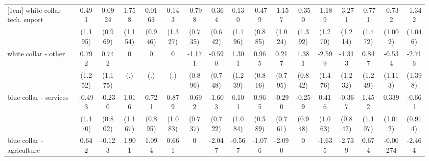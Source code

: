 {\begin{tabular}{l*{16}{c}}
[1em]
white collar - tech. suport&       0.491         &      0.0924         &       1.758         &      0.0163         &       0.143         &      -0.798         &      -0.364         &       0.130         &      -0.479         &      -1.157         &      -0.350         &      -1.189         &      -3.271\sym{**} &      -0.771         &      -0.732         &      -1.342         \\
                    &     (1.195)         &     (0.969)         &     (1.154)         &     (0.946)         &     (1.327)         &     (0.735)         &     (0.642)         &     (1.196)         &     (0.885)         &     (1.024)         &     (1.392)         &     (1.270)         &     (1.214)         &     (1.472)         &     (1.002)         &     (1.046)         \\
[1em]
white collar - other&       0.792         &       0.742         &           0         &           0         &           0         &      -1.171         &      -0.590         &       1.301         &       0.965         &       0.217         &       1.381         &      -2.599         &      -1.313         &       0.847         &      -0.534         &      -2.716         \\
                    &     (1.252)         &     (1.175)         &         (.)         &         (.)         &         (.)         &     (0.896)         &     (0.748)         &     (1.239)         &     (0.816)         &     (0.795)         &     (0.842)         &     (1.476)         &     (1.232)         &     (1.249)         &     (1.113)         &     (1.398)         \\
[1em]
blue collar - services&      -0.493         &      -0.230         &       1.016         &       0.721         &       0.879         &      -0.692         &      -1.603\sym{*}  &       0.101         &       0.965         &      -0.290         &      -0.259         &       0.416         &      -0.367         &       1.452         &       0.339         &      -0.661         \\
                    &     (1.170)         &     (0.802)         &     (1.167)         &     (0.895)         &     (1.083)         &     (0.737)         &     (0.722)         &     (1.084)         &     (0.589)         &     (0.761)         &     (0.948)         &     (1.063)         &     (0.842)         &     (1.107)         &     (1.012)         &     (0.914)         \\
[1em]
blue collar - agriculture&       0.642         &      -0.123         &       1.901         &       1.094         &       0.661         &           0         &      -2.047         &      -0.567         &      -1.076         &      -2.090         &           0         &      -1.635         &      -2.739\sym{*}  &       0.674         &    -0.00274         &      -2.464         \\

\end{tabular}}
